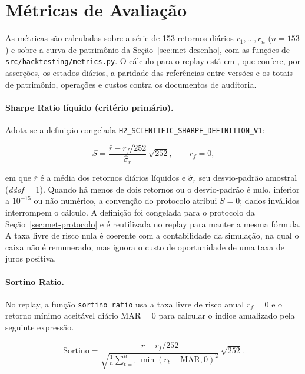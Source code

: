 \section{Métricas de Avaliação}
\label{sec:met-metricas}

As métricas são calculadas sobre a série de 153 retornos diários $r_1, \ldots, r_n$ ($n = 153$) e sobre a curva de patrimônio da Seção~\ref{sec:met-desenho}, com as funções de \texttt{src/backtesting/metrics.py}. O cálculo para o replay está em , que confere, por asserções, os estados diários, a paridade das referências entre versões e os totais de patrimônio, operações e custos contra os documentos de auditoria.

\paragraph*{Sharpe Ratio líquido (critério primário).} Adota-se a definição congelada \texttt{H2\_SCIENTIFIC\_SHARPE\_DEFINITION\_V1}:

\begin{equation}
S = \frac{\bar{r} - r_f/252}{\hat{\sigma}_r}\,\sqrt{252}, \qquad r_f = 0,
\label{eq:met-sharpe}
\end{equation}

\noindent em que $\bar{r}$ é a média dos retornos diários líquidos e $\hat{\sigma}_r$ seu desvio-padrão amostral (\textit{ddof} = 1). Quando há menos de dois retornos ou o desvio-padrão é nulo, inferior a $10^{-15}$ ou não numérico, a convenção do protocolo atribui $S = 0$; dados inválidos interrompem o cálculo. A definição foi congelada para o protocolo da Seção~\ref{sec:met-protocolo} e é reutilizada no replay para manter a mesma fórmula. A taxa livre de risco nula é coerente com a contabilidade da simulação, na qual o caixa não é remunerado, mas ignora o custo de oportunidade de uma taxa de juros positiva.

\paragraph*{Sortino Ratio.} No replay, a função \texttt{sortino\_ratio} usa a taxa livre de risco anual $r_f = 0$ e o retorno mínimo aceitável diário $\text{MAR} = 0$ para calcular o índice anualizado pela seguinte expressão.

\begin{equation}
\text{Sortino} = \frac{\bar{r} - r_f/252}{\sqrt{\frac{1}{n}\sum_{t=1}^{n}\min(r_t - \text{MAR}, 0)^2}}\,\sqrt{252}.
\label{eq:met-sortino}
\end{equation}


